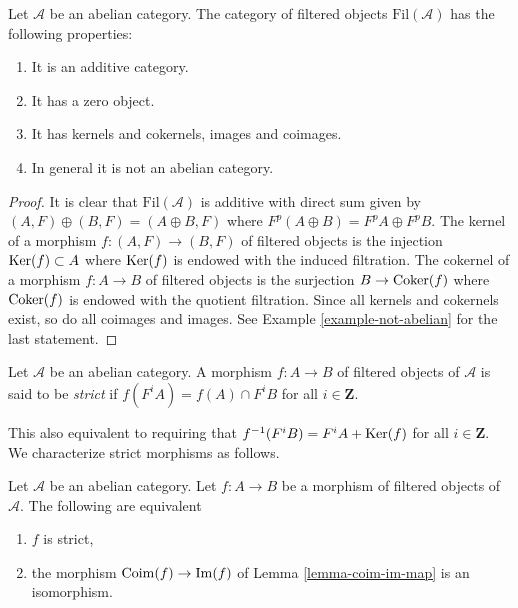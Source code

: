 \begin{lemma}
\label{lemma-filtered}
Let $\mathcal{A}$ be an abelian category.
The category of filtered objects $\text{Fil}(\mathcal{A})$
has the following properties:
\begin{enumerate}
\item It is an additive category.
\item It has a zero object.
\item It has kernels and cokernels, images and coimages.
\item In general it is not an abelian category.
\end{enumerate}
\end{lemma}

\begin{proof}
It is clear that $\text{Fil}(\mathcal{A})$ is additive with direct
sum given by $(A, F) \oplus (B, F) = (A \oplus B, F)$ where
$F^p(A \oplus B) = F^pA \oplus F^pB$.
The kernel of a morphism $f : (A, F) \to (B, F)$ of filtered
objects is the injection $\mathop{\mathrm{Ker}}(f) \subset A$ where $\mathop{\mathrm{Ker}}(f)$
is endowed with the induced filtration.
The cokernel of a morphism $f : A \to B$ of filtered
objects is the surjection $B \to \mathop{\mathrm{Coker}}(f)$ where $\mathop{\mathrm{Coker}}(f)$
is endowed with the quotient filtration. Since all kernels and cokernels
exist, so do all coimages and images. See
Example \ref{example-not-abelian}
for the last statement.
\end{proof}

\begin{definition}
\label{definition-strict}
Let $\mathcal{A}$ be an abelian category.
A morphism $f : A \to B$ of filtered objects of $\mathcal{A}$ is
said to be {\it strict} if $f(F^iA) = f(A) \cap F^iB$ for
all $i \in \mathbf{Z}$.
\end{definition}

\noindent
This also equivalent to requiring that $f^{-1}(F^iB) = F^iA + \mathop{\mathrm{Ker}}(f)$
for all $i \in \mathbf{Z}$. We characterize strict morphisms
as follows.

\begin{lemma}
\label{lemma-characterize-strict-general}
Let $\mathcal{A}$ be an abelian category.
Let $f : A \to B$ be a morphism of filtered objects of $\mathcal{A}$.
The following are equivalent
\begin{enumerate}
\item $f$ is strict,
\item the morphism $\mathop{\mathrm{Coim}}(f) \to \mathop{\mathrm{Im}}(f)$ of
Lemma \ref{lemma-coim-im-map}
is an isomorphism.
\end{enumerate}
\end{lemma}

